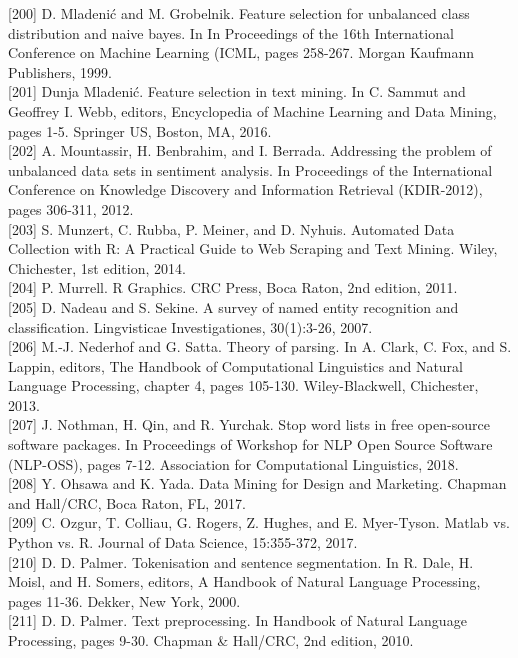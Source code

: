 \documentclass[10pt]{book}
\begin{document}
[200] D. Mladenić and M. Grobelnik. Feature selection for unbalanced class distribution and naive bayes. In In Proceedings of the 16th International Conference on Machine Learning (ICML, pages 258-267. Morgan Kaufmann Publishers, 1999.\\[0pt]
[201] Dunja Mladenić. Feature selection in text mining. In C. Sammut and Geoffrey I. Webb, editors, Encyclopedia of Machine Learning and Data Mining, pages 1-5. Springer US, Boston, MA, 2016.\\[0pt]
[202] A. Mountassir, H. Benbrahim, and I. Berrada. Addressing the problem of unbalanced data sets in sentiment analysis. In Proceedings of the International Conference on Knowledge Discovery and Information Retrieval (KDIR-2012), pages 306-311, 2012.\\[0pt]
[203] S. Munzert, C. Rubba, P. Meiner, and D. Nyhuis. Automated Data Collection with R: A Practical Guide to Web Scraping and Text Mining. Wiley, Chichester, 1st edition, 2014.\\[0pt]
[204] P. Murrell. R Graphics. CRC Press, Boca Raton, 2nd edition, 2011.\\[0pt]
[205] D. Nadeau and S. Sekine. A survey of named entity recognition and classification. Lingvisticae Investigationes, 30(1):3-26, 2007.\\[0pt]
[206] M.-J. Nederhof and G. Satta. Theory of parsing. In A. Clark, C. Fox, and S. Lappin, editors, The Handbook of Computational Linguistics and Natural Language Processing, chapter 4, pages 105-130. Wiley-Blackwell, Chichester, 2013.\\[0pt]
[207] J. Nothman, H. Qin, and R. Yurchak. Stop word lists in free open-source software packages. In Proceedings of Workshop for NLP Open Source Software (NLP-OSS), pages 7-12. Association for Computational Linguistics, 2018.\\[0pt]
[208] Y. Ohsawa and K. Yada. Data Mining for Design and Marketing. Chapman and Hall/CRC, Boca Raton, FL, 2017.\\[0pt]
[209] C. Ozgur, T. Colliau, G. Rogers, Z. Hughes, and E. Myer-Tyson. Matlab vs. Python vs. R. Journal of Data Science, 15:355-372, 2017.\\[0pt]
[210] D. D. Palmer. Tokenisation and sentence segmentation. In R. Dale, H. Moisl, and H. Somers, editors, A Handbook of Natural Language Processing, pages 11-36. Dekker, New York, 2000.\\[0pt]
[211] D. D. Palmer. Text preprocessing. In Handbook of Natural Language Processing, pages 9-30. Chapman \& Hall/CRC, 2nd edition, 2010.\\[0pt]
\end{document}
